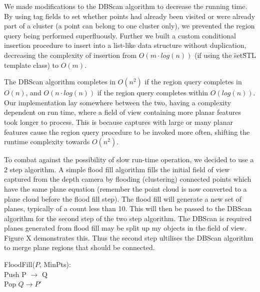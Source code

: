 \documentclass[]{article}
\begin{document}
{We made modifications to the DBScan algorithm to decrease the running time. By using tag fields to set whether points had already been visited or were already part of a cluster (a point can belong to one cluster only), we prevented the region query being performed superfluously. Further we built a custom conditional insertion procedure to insert into a list-like data structure without duplication, decreasing the complexity of insertion from $O(m \cdot log(n))$ (if using the \"set\" STL template class) to $O(m)$.

The DBScan algorithm completes in $O(n^2)$ if the region query completes in $O(n)$, and $O(n \cdot log(n))$ if the region query completes within $O(log(n))$. Our implementation lay somewhere between the two, having a complexity dependent on run time, where a field of view containing more planar features took longer to process. This is because captures with large or many planar features cause the region query procedure to be invoked more often, shifting the runtime complexity towards $O(n^2)$.

To combat against the possibility of slow run-time operation, we decided to use a 2 step algorithm. A simple flood fill algorithm fills the initial field of view captured from the depth camera by flooding  (clustering) connected points which have the same plane equation (remember the point cloud is now converted to a plane cloud before the flood fill step). The flood fill will generate a new set of planes, typically of a count less than 10. This will then be passed to the DBScan algorithm for the second step of the two step algorithm. The DBScan is required planes generated from flood fill may be split up my objects in the field of view. Figure X demonstrates this. Thus the second step ultilises the DBScan algorithm to merge plane regions that should be connected. 

\begin{algorithm}[tbp]
	\SetAlgoLined
	\bigskip
	FloodFill($P$, MinPts): \\
	Push P $\rightarrow$ Q \\
	{
	 	Pop $Q \rightarrow P'$ \\
		}
\end{algorithm}}
\end{document}
